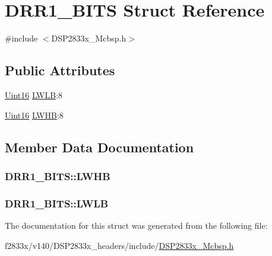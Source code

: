 \hypertarget{struct_d_r_r1___b_i_t_s}{}\section{D\+R\+R1\+\_\+\+B\+I\+T\+S Struct Reference}
\label{struct_d_r_r1___b_i_t_s}


{\ttfamily \#include $<$D\+S\+P2833x\+\_\+\+Mcbsp.\+h$>$}

\subsection*{Public Attributes}
\begin{DoxyCompactItemize}
\item 
\hyperlink{_d_s_p2833x___device_8h_a59a9f6be4562c327cbfb4f7e8e18f08b}{Uint16} \hyperlink{struct_d_r_r1___b_i_t_s_ab713d1c9313b575136d153a2cce5981c}{L\+W\+L\+B}\+:8
\item 
\hyperlink{_d_s_p2833x___device_8h_a59a9f6be4562c327cbfb4f7e8e18f08b}{Uint16} \hyperlink{struct_d_r_r1___b_i_t_s_adbfa811db895ebdc60b4855c36116a9f}{L\+W\+H\+B}\+:8
\end{DoxyCompactItemize}


\subsection{Member Data Documentation}
\hypertarget{struct_d_r_r1___b_i_t_s_adbfa811db895ebdc60b4855c36116a9f}{}
\subsubsection[{L\+W\+H\+B}]{ D\+R\+R1\+\_\+\+B\+I\+T\+S\+::\+L\+W\+H\+B}\label{struct_d_r_r1___b_i_t_s_adbfa811db895ebdc60b4855c36116a9f}
\hypertarget{struct_d_r_r1___b_i_t_s_ab713d1c9313b575136d153a2cce5981c}{}
\subsubsection[{L\+W\+L\+B}]{ D\+R\+R1\+\_\+\+B\+I\+T\+S\+::\+L\+W\+L\+B}\label{struct_d_r_r1___b_i_t_s_ab713d1c9313b575136d153a2cce5981c}


The documentation for this struct was generated from the following file\+:\begin{DoxyCompactItemize}
\item 
f2833x/v140/\+D\+S\+P2833x\+\_\+headers/include/\hyperlink{_d_s_p2833x___mcbsp_8h}{D\+S\+P2833x\+\_\+\+Mcbsp.\+h}\end{DoxyCompactItemize}
